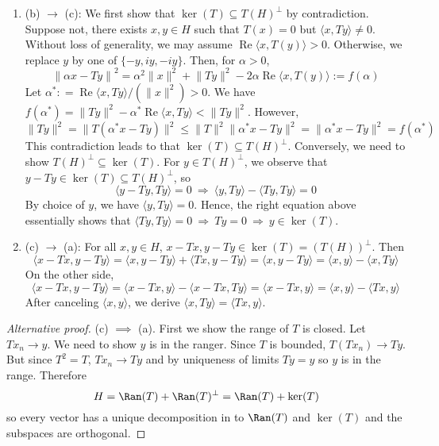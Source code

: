\begin{itemize}
\begin{enumerate}[$\bullet$]
		\item (b) $\rightarrow$ (c): We first show that $\ker(T)\subseteq T(H)^\perp$ by contradiction. 
		Suppose not, there exists $x,y\in H$ such that $T(x)=0$ but $\langle x, Ty\rangle \neq 0$. Without loss of generality, we may assume $\operatorname{Re}\langle x, T(y)\rangle >0$. Otherwise, we replace $y$ by one of $\{-y, iy, -iy\}$. Then, for $\alpha > 0$,
		$$
		 \left\lVert \alpha x-Ty\right\rVert^2 = \alpha^2\lVert x\rVert^2 + \lVert Ty\rVert^2 -2\alpha\operatorname{Re}\langle x, T(y)\rangle:=f(\alpha)
		$$
		Let $\alpha^*: = \operatorname{Re}\langle x, Ty\rangle/(\lVert x\rVert^2)>0$. We have $f(\alpha^*) = \lVert Ty\rVert^2 - \alpha^* \operatorname{Re}\langle x,Ty\rangle < \lVert Ty\rVert^2$. However,
		$$
		 \lVert Ty\rVert^2  = \lVert T(\alpha^*x-Ty)\rVert^2 \le \lVert T\rVert^2\lVert \alpha^*x-Ty\rVert^2 = \lVert \alpha^*x-Ty\rVert^2 = f(\alpha^*)
		$$
		This contradiction leads to that $\ker(T)\subseteq T(H)^\perp$. Conversely, we need to show $T(H)^\perp\subseteq \ker(T)$. For $y\in T(H)^\perp$, we observe that $y-Ty\in \operatorname{ker}(T)\subseteq T(H)^\perp$, so
		$$
		\langle y-Ty, Ty\rangle =0 ~\Rightarrow~ \langle y, Ty\rangle - \langle Ty, Ty\rangle = 0
		$$
		By choice of $y$, we have $\langle y, Ty\rangle =0$. Hence, the right equation above essentially shows that $\langle Ty,Ty\rangle = 0~\Rightarrow~Ty=0~\Rightarrow~y\in \ker(T)$.
		\item (c) $\rightarrow$ (a): For all $x,y\in H$, $x-Tx, y-Ty\in \operatorname{ker}(T)=(T(H))^\perp$. Then
		$$
		\langle x-Tx, y-Ty\rangle = \langle x, y-Ty\rangle + \langle Tx, y-Ty\rangle = \langle x, y-Ty\rangle = \langle x, y\rangle - \langle x, Ty\rangle
		$$
		On the other side,
		$$
		\langle x-Tx, y-Ty\rangle = \langle x-Tx, y\rangle -\langle x-Tx, Ty\rangle = \langle x-Tx, y\rangle = \langle x, y\rangle -\langle Tx, y\rangle
		$$
		After canceling $\langle x,y\rangle$, we derive $\langle x, Ty\rangle = \langle Tx, y\rangle$.
	\end{enumerate}
\iffalse Let $T : \calh \to \calh$ be bounded and linear and $T=T^2$. Prove the following are equivalent.
	\begin{itemize}
		\item[(a)] $\lip Tx,y\rip = \lip x,Ty\rip$
		\item[(b)] $\|T\|=1$
		\item[(c)] $\ker(T)=(T(\calh))^\perp$
	\end{itemize}
\fi
\begin{proof}[Alternative proof]
(c) $\implies$ (a). First we show the range of $T$ is closed. Let $Tx_n \to y$. We need to show $y$ is in the ranger. Since $T$ is bounded, $T(Tx_n) \to Ty$. But since $T^2=T$, $Tx_n \to Ty$ and by uniqueness of limits $Ty=y$ so $y$ is in the range. Therefore
	\[ H = \Ran(T)+\Ran(T)^\perp = \Ran(T)+\ker(T) \]
so every vector has a unique decomposition in to $\Ran(T)$ and $\ker(T)$ and the subspaces are orthogonal.


\end{proof}
\end{itemize}
